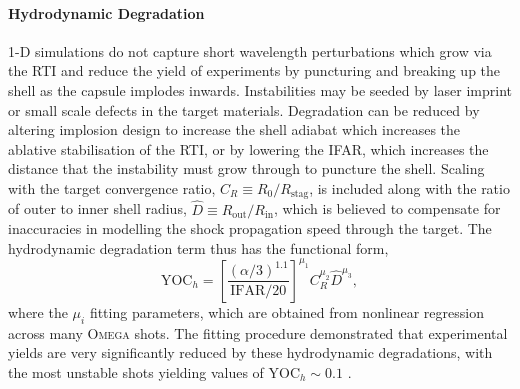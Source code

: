 \paragraph*{Hydrodynamic Degradation}
1-D simulations do not capture short wavelength perturbations which grow via the \ac{RTI} and reduce the yield of experiments by puncturing and breaking up the shell as the capsule implodes inwards.
Instabilities may be seeded by laser imprint or small scale defects in the target materials.
Degradation can be reduced by altering implosion design to increase the shell adiabat which increases the ablative stabilisation of the \ac{RTI}, or by lowering the \ac{IFAR}, which increases the distance that the instability must grow through to puncture the shell.
Scaling with the target convergence ratio, $C_R\equiv R_0/R_{\text{stag}}$, is included along with the ratio of outer to inner shell radius, $\hat{D}\equiv R_{\text{out}}/R_{\text{in}}$, which is believed to compensate for inaccuracies in modelling the shock propagation speed through the target.
The hydrodynamic degradation term thus has the functional form,
\begin{equation}
    \text{YOC}_h = \left[ \frac{\left( \alpha/3 \right)^{1.1}}{\text{IFAR}/20} \right]^{\mu_1} C_R^{\mu_2} \hat{D}^{\mu_3},
\end{equation}
where the $\mu_i$ fitting parameters, which are obtained from nonlinear regression across many \textsc{Omega} shots.
The fitting procedure demonstrated that experimental yields are very significantly reduced by these hydrodynamic degradations, with the most unstable shots yielding values of $\text{YOC}_h\sim 0.1$ \cite{lees_understanding_2023}.

